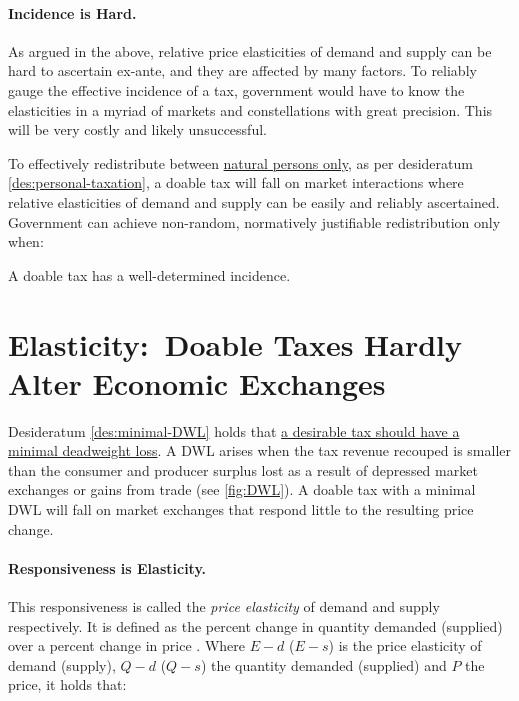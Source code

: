 \paragraph{Incidence is Hard.}
As argued in the above, relative price elasticities of demand and supply can be hard to ascertain ex-ante, and they are affected by many factors.
To reliably gauge the effective incidence of a tax, government would have to know the elasticities in a myriad of markets and constellations with great precision.
This will be very costly and likely unsuccessful.


To effectively redistribute between \href{des:personal-taxation}{natural persons only}, as per desideratum \ref{des:personal-taxation}, a doable tax will fall on market interactions where relative elasticities of demand and supply can be easily and reliably ascertained.
Government can achieve non-random, normatively justifiable redistribution only when:

\begin{desideratum}
	A doable tax has a well-determined incidence.
	\label{des:determined-incidence}
\end{desideratum}

\section[Elasticity]{Elasticity:~Doable Taxes Hardly Alter Economic Exchanges}
	\label{sec:tax-elasticity}
Desideratum \ref{des:minimal-DWL} holds that \href{des:minimal-DWL}{a desirable tax should have a minimal deadweight loss}.
A DWL arises when the tax revenue recouped is smaller than the consumer and producer surplus lost as a result of depressed market exchanges or gains from trade (see \autoref{fig:DWL}).
A doable tax with a minimal DWL will fall on market exchanges that respond little to the resulting price change.

\paragraph{Responsiveness is Elasticity.}
This responsiveness is called the \emph{price elasticity} of demand and supply respectively.
It is defined as the percent change in quantity demanded (supplied) over a percent change in price \citep{Marshall1890}.
Where $E-{d}$ ($E-{s}$)  is the price elasticity of demand (supply), $Q-{d}$ ($Q-{s}$) the quantity demanded (supplied) and $P$ the price, it holds that:

